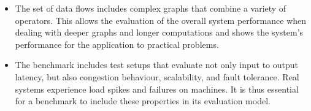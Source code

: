 \begin{itemize}
\item The set of data flows includes complex graphs that combine a variety of operators. This allows the evaluation of the overall system performance when dealing with deeper graphs and longer computations and shows the system's performance for the application to practical problems.
\item The benchmark includes test setups that evaluate not only input to output latency, but also congestion behaviour, scalability, and fault tolerance. Real systems experience load spikes and failures on machines. It is thus essential for a benchmark to include these properties in its evaluation model.
\end{itemize}

